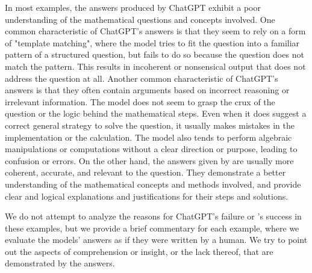 In most examples, the answers produced by ChatGPT exhibit a poor understanding of the mathematical questions and concepts involved. One common characteristic of ChatGPT's answers is that they seem to rely on a form of "template matching", where the model tries to fit the question into a familiar pattern of a structured question, but fails to do so because the question does not match the pattern. This results in incoherent or nonsensical output that does not address the question at all. Another common characteristic of ChatGPT's answers is that they often contain arguments based on incorrect reasoning or irrelevant information. The model does not seem to grasp the crux of the question or the logic behind the mathematical steps. Even when it does suggest a correct general strategy to solve the question, it usually makes mistakes in the implementation or the calculation. The model also tends to perform algebraic manipulations or computations without a clear direction or purpose, leading to confusion or errors. On the other hand, the answers given by \DV are usually more coherent, accurate, and relevant to the question. They demonstrate a better understanding of the mathematical concepts and methods involved, and provide clear and logical explanations and justifications for their steps and solutions. 

We do not attempt to analyze the reasons for ChatGPT's failure or \DV's success in these examples, but we provide a brief commentary for each example, where we evaluate the models' answers as if they were written by a human. We try to point out the aspects of comprehension or insight, or the lack thereof, that are demonstrated by the answers. %

